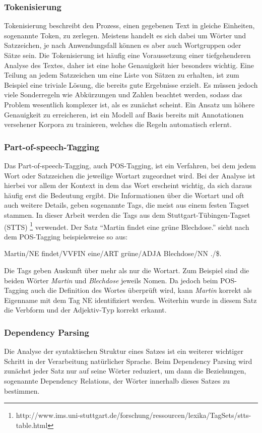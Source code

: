 \subsubsection*{Tokenisierung}
Tokenisierung beschreibt den Prozess, einen gegebenen Text in gleiche Einheiten, sogenannte Token, zu zerlegen. Meistens handelt es sich dabei um Wörter und Satzzeichen, je nach Anwendungsfall können es aber auch Wortgruppen oder Sätze sein. Die Tokenisierung ist häufig eine Voraussetzung einer tiefgehenderen Analyse des Textes, daher ist eine hohe Genauigkeit hier besonders wichtig. Eine Teilung an jedem Satzzeichen um eine Liste von Sätzen zu erhalten, ist zum Beispiel eine triviale Lösung, die bereits gute Ergebnisse erzielt. Es müssen jedoch viele Sonderregeln wie Abkürzungen und Zahlen beachtet werden, sodass das Problem wesentlich komplexer ist, als es zunächst scheint. Ein Ansatz um höhere Genauigkeit zu erreicheren, ist ein Modell auf Basis bereits mit Annotationen versehener Korpora zu trainieren, welches die Regeln automatisch erlernt.

\subsubsection*{Part-of-speech-Tagging}
Das Part-of-speech-Tagging, auch POS-Tagging, ist ein Verfahren, bei dem jedem Wort oder Satzzeichen die jeweilige Wortart zugeordnet wird. Bei der Analyse ist hierbei vor allem der Kontext in dem das Wort erscheint wichtig, da sich daraus häufig erst die Bedeutung ergibt. Die Informationen über die Wortart und oft auch weitere Details, geben sogenannte Tags, die meist aus einem festen Tagset stammen. In dieser Arbeit werden die Tags aus dem Stuttgart-Tübingen-Tagset (STTS) \footnote{http://www.ims.uni-stuttgart.de/forschung/ressourcen/lexika/TagSets/stts-table.html} verwendet. Der Satz "`Martin findet eine grüne Blechdose."' sieht nach dem POS-Tagging beispielsweise so aus:

Martin/NE findet/VVFIN eine/ART grüne/ADJA Blechdose/NN ./\$.

Die Tags geben Auskunft über mehr als nur die Wortart. Zum Beispiel sind die beiden Wörter \textit{Martin} und \textit{Blechdose} jeweils Nomen. Da jedoch beim POS-Tagging auch die Definition des Wortes überprüft wird, kann \textit{Martin} korrekt als Eigenname mit dem Tag NE identifiziert werden. Weiterhin wurde in diesem Satz die Verbform und der Adjektiv-Typ korrekt erkannt.

\subsubsection*{Dependency Parsing}
Die Analyse der syntaktischen Struktur eines Satzes ist ein weiterer wichtiger Schritt in der Verarbeitung natürlicher Sprache. Beim Dependency Parsing wird zunächst jeder Satz nur auf seine Wörter reduziert, um dann die Beziehungen, sogenannte Dependency Relations, der Wörter innerhalb dieses Satzes zu bestimmen.

